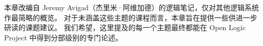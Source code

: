 \documentclass[../../../include/open-logic-chapter]{subfiles}
\begin{document}

\begin{editorial}
本章改编自 Jeremy Avigad（杰里米·阿维加德）的逻辑笔记，仅对其他逻辑系统作最简略的概览。
  对于未涵盖这些主题的课程而言，本章旨在提供一些供进一步研读的课题建议。
  我们希望，这里提及的每一个主题最终都能在 Open Logic Project 中得到分部级别的专门论述。
\end{editorial}


\OLEndChapterHook
\end{document}
